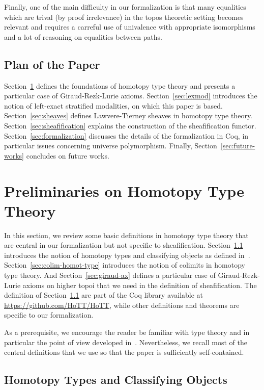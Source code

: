\documentclass[conference]{IEEEtran}
\begin{document}
Finally, one of the main difficulty in our formalization is that many
equalities which are trival (by proof irrelevance) in the topos theoretic
setting becomes relevant and requires a carreful use of univalence
with appropriate isomorphisms and a lot of reasoning on equalities
between paths.

\subsection{Plan of the Paper}

Section~\ref{sec:hott} defines the foundations of homotopy type theory
and presents a particular case of Giraud-Rezk-Lurie axioms. 
%
Section~\ref{sec:lexmod} introduces the notion of left-exact stratified
modalities, on which this paper is based.
%
Section~\ref{sec:sheaves} defines Lawvere-Tierney sheaves in homotopy
type theory.
%
Section~\ref{sec:sheafification} explains the construction of the
sheafification functor.
%
Section~\ref{sec:formalization} discusses the details of the
formalization in Coq, in particular issues concerning universe
polymorphism.
%
Finally, Section~\ref{sec:future-works} concludes on future works.


\section{Preliminaries on Homotopy Type Theory}
\label{sec:hott}

In this section, we review some basic definitions in homotopy type
theory that are central in our formalization but not specific to
sheafification. 
%
Section~\ref{ssec:hott} introduces the notion of homotopy types and
classifying objects as defined in~\cite{sets_in_hott}.
%
Section~\ref{sec:colim-homot-type} introduces the notion of colimits
in homotopy type theory. 
%
And Section~\ref{sec:giraud-ax} defines a particular case of
Giraud-Rezk-Lurie axioms on higher topoi that we need in the
definition of sheafification.
%
The definition of Section~\ref{ssec:hott} are part of the Coq library
available at \url{https://github.com/HoTT/HoTT}, while other definitions
and theorems are specific to our formalization. 

As a prerequisite, we encourage the reader be familiar with type theory and
in particular the point of view developed
in~\cite{hottbook}. Nevertheless, we recall most of the central definitions 
that we use so that the paper is sufficiently self-contained.
%

 
 \subsection{Homotopy Types and Classifying Objects}
\label{ssec:hott}
\end{document}
